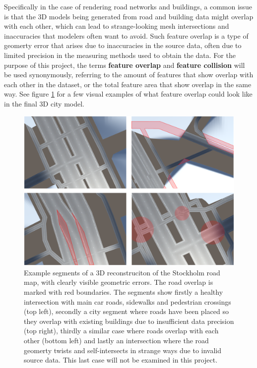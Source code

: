 \documentclass{kththesis}
\begin{document}
Specifically in the case of rendering road networks and buildings, a common issue is that the 3D models being generated from road and building data might overlap with each other, which can lead to strange-looking mesh intersections and inaccuracies that modelers often want to avoid.
Such feature overlap is a type of geomerty error that arises due to inaccuracies in the source data, often due to limited precision in the measuring methods used to obtain the data.
For the purpose of this project, the terms \textbf{feature overlap} and \textbf{feature collision} will be used synonymously, referring to the amount of features that show overlap with each other in the dataset, or the total feature area that show overlap in the same way.
See figure \ref{fig:img_road_error_cases} for a few visual examples of what feature overlap could look like in the final 3D city model.

\begin{figure}[H]
    \centering
    \includegraphics[width=\textwidth,height=0.5\textheight,keepaspectratio]{img_road_error_cases}
    \caption{Example segments of a 3D reconstruciton of the Stockholm road map, with clearly visible geometric errors. The road overlap is marked with red boundaries. The segments show firstly a healthy intersection with main car roads, sidewalks and pedestrian crossings (top left), secondly a city segment where roads have been placed so they overlap with existing buildings due to insufficient data precision (top right), thirdly a similar case where roads overlap with each other (bottom left) and lastly an intersection where the road geomerty twists and self-intersects in strange ways due to invalid source data. This last case will not be examined in this project.}
    \label{fig:img_road_error_cases}
\end{figure}
\end{document}
